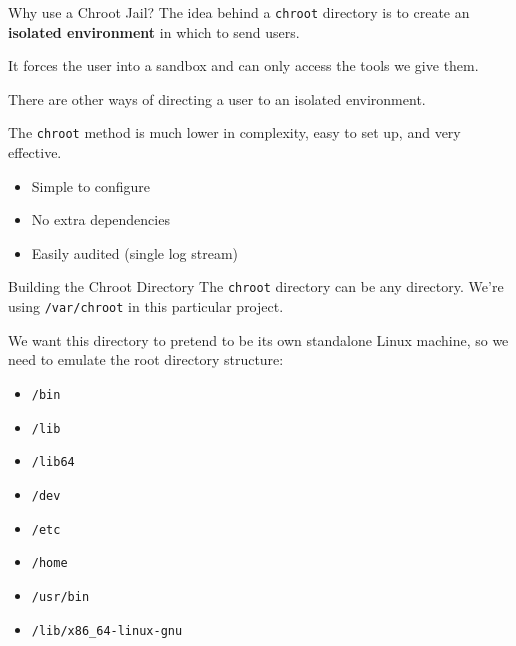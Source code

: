 \documentclass[14pt,compress,dvipsnames,aspectratio=169]{beamer} %
\begin{document}
\begin{frame}{Why use a Chroot Jail?}
    The idea behind a \texttt{chroot} directory is to create an \textbf{isolated
    environment} in which to send users.   

    \vspace{0.25cm}
    It forces the user into a sandbox and can only access the tools we give them.  

    \vspace{0.25cm}
    There are other ways of directing a user to an isolated environment.  

    \vspace{0.25cm}
    The \texttt{chroot} method is much lower in complexity, easy to set up, and very effective.  
    \begin{itemize}
        \item Simple to configure
        \item No extra dependencies
        \item Easily audited (single log stream)
    \end{itemize}
\end{frame}





\begin{frame}{Building the Chroot Directory}
    The \texttt{chroot} directory can be any directory. We're using
    \texttt{/var/chroot} in this particular project.

    We want this directory to pretend to be its own standalone Linux machine, so we
    need to emulate the root directory structure:  

    \begin{itemize}
        \item{\texttt{/bin}} 
        \item{\texttt{/lib}} 
        \item{\texttt{/lib64}} 
        \item{\texttt{/dev}} 
        \item{\texttt{/etc}} 
        \item{\texttt{/home}} 
        \item{\texttt{/usr/bin}} 
        \item{\texttt{/lib/x86\_64-linux-gnu}} 
    \end{itemize}
\end{frame}
\end{document}
